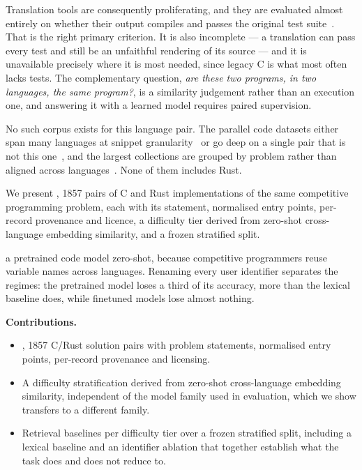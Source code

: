 Translation tools are consequently proliferating, and they are evaluated almost
entirely on whether their output compiles and passes the original test
suite~\cite{nitin2026c2saferrust,shetty2024syzygy}. That is the right primary
criterion. It is also incomplete --- a translation can pass every test and
still be an unfaithful rendering of its source --- and it is unavailable
precisely where it is most needed, since legacy C is what most often lacks
tests. The complementary question, \emph{are these two programs, in two
languages, the same program?}, is a similarity judgement rather than an
execution one, and answering it with a learned model requires paired
supervision.

No such corpus exists for this language pair. The parallel code datasets either
span many languages at snippet
granularity~\cite{zhu2022xlcost,zhu2022cost} or go deep on a single pair that
is not this one~\cite{ahmad2023avatar}, and the largest collections are
grouped by problem rather than aligned across
languages~\cite{puri2021codenet,lu2021codexglue}. None of them includes Rust.

We present \dsname, 1857 pairs of C and Rust implementations of the same
competitive programming problem, each with its statement, normalised entry
points, per-record provenance and licence, a difficulty tier derived from
zero-shot cross-language embedding similarity, and a frozen stratified split.

 a pretrained code model zero-shot,
because competitive programmers reuse variable names across languages. Renaming
every user identifier separates the regimes: the pretrained model loses a third
of its accuracy, more than the lexical baseline does, while finetuned models
lose almost nothing.

\noindent\textbf{Contributions.}
\begin{itemize}
  \item \dsname, 1857 C/Rust solution pairs with problem statements,
        normalised entry points, per-record provenance and licensing.
  \item A difficulty stratification derived from zero-shot cross-language
        embedding similarity, independent of the model family used in
        evaluation, which we show transfers to a different family.
  \item Retrieval baselines per difficulty tier over a frozen stratified
        split, including a lexical baseline and an identifier ablation that
        together establish what the task does and does not reduce to.
\end{itemize}

